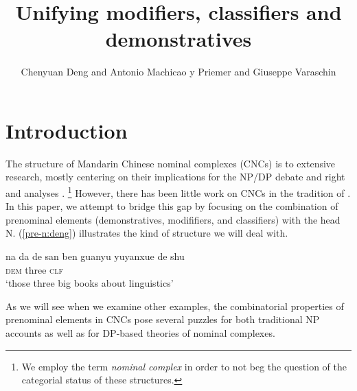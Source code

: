 \documentclass[output=paper,colorlinks,citecolor=brown]{langscibook}
\author{Chenyuan Deng\orcid{0009-0004-0490-5250}\affiliation{Humboldt-Universität zu Berlin} and 	Antonio Machicao y Priemer\orcid{0000-0001-7321-0795}\affiliation{Humboldt-Universität zu Berlin} and  	Giuseppe Varaschin\orcid{0000-0003-1446-2700}\affiliation{Humboldt-Universität zu Berlin}
        }
\title[Unifying modifiers, classifiers and demonstratives]{Unifying modifiers, classifiers and demonstratives}
\begin{document}
\maketitle

%
%
%
%
%
%

\section{Introduction}\label{sec:int:deng}
The structure of Mandarin Chinese nominal complexes (CNCs) is  to extensive research, mostly centering on their implications for  the NP/DP debate and right and  analyses \citep{cheng1999bare, bovskovic2013word, Her&Tsai20, jiang_jenks_jin_2022}.%
%
\footnote{We employ the term \emph{nominal complex} in order to not beg the question of the categorial status of these structures. }  %
%
However, there has been little work on CNCs in the tradition of  \citep{Pollard&Sag94a}. In this paper, we attempt to bridge this gap by focusing on the combination of prenominal elements (demonstratives,
modififiers, and classifiers) %
with the head N. (\ref{pre-n:deng}) illustrates the kind of structure we will deal with.
		
\ea

	\gll na da de san ben guanyu yuyanxue de shu\\
	\textsc{dem}   three \textsc{clf}     \\
	\glt  `those three big books about linguistics'  \label{pre-n:deng}
\z 			

As we will see when we examine other examples, the combinatorial properties of prenominal elements in CNCs pose several puzzles for both traditional NP accounts as well as for DP-based theories of nominal complexes. %


\end{document}
